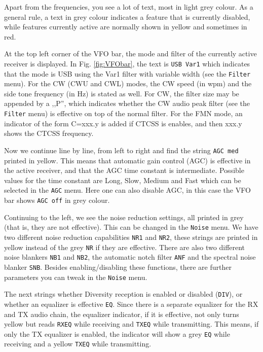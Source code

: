 \documentclass[12pt]{book}
\def\rett#1{\texttt{\color{red}#1}}
\def\bltt#1{\texttt{\color{blue}#1}}
\begin{document}
Apart from the frequencies, you see a lot  of text, most in
light grey colour. As a general rule, a text  in grey
colour indicates a feature that is currently disabled,
while features currently active are normally shown in
yellow and sometimes in red.

At the top left  corner of the VFO bar, the mode and
filter of the currently active receiver is displayed.
In Fig. \ref{fig:VFObar}, the text is \rett{USB Var1}
which indicates that the  mode
is USB using the Var1 filter with variable width (see the \bltt{Filter} menu).
For the CW (CWU and CWL) modes, the CW speed (in wpm) and the side tone
frequency (in Hz) is stated as well. For CW, the filter size may be appended
by a ,,P'', which indicates whether the CW audio peak filter (see the
\bltt{Filter} menu) is effective on top of the normal filter.
For the FMN mode, an indicator of the form C=xxx.y is added if
CTCSS is enables, and then xxx.y shows the CTCSS frequency.

Now we continue line by line, from left to right and find
the string \rett{AGC med} printed in yellow. This means
that automatic gain control (AGC)  is effective  in the
active receiver, and that the AGC time constant is
intermediate. Possible values for the time constant
are Long, Slow, Medium and Fast which can be selected
in the \bltt{AGC} menu. Here one can  also disable AGC,
in this case the VFO bar shows \rett{AGC off} in grey
colour.

Continuing to the left, we see the noise reduction settings,
all printed in grey (that is, they are not effective). This
can be changed in the \bltt{Noise} menu. We have two different
noise reduction capabilities \rett{NR1} and \rett{NR2}, these
strings are printed in yellow instead of the grey \rett{NR} if
they are effective. There are also two different noise blankers
\rett{NB1} and \rett{NB2}, the automatic notch  filter
\rett{ANF} and the spectral  noise blanker \rett{SNB}.
Besides enabling/disabling these functions, there are  further parameters
you can tweak in the \bltt{Noise} menu.

The next strings whether Diversity reception is enabled or disabled
(\rett{DIV}), or whether an equalizer is effective \rett{EQ}.
Since there is a separate equalizer for the RX and TX audio chain,
the equalizer indicator, if it is effective, not only turns yellow
but reads \rett{RXEQ} while receiving and \rett{TXEQ} while
transmitting. This means, if only the TX equalizer is enabled,
the indicator will show a  grey \rett{EQ} while receiving
and a yellow \rett{TXEQ}  while  transmitting.
\end{document}
